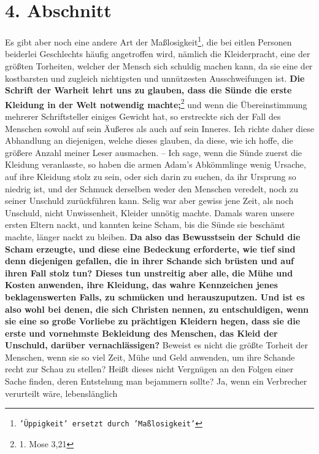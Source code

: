 \section{4. Abschnitt} \label{kap14_ab4}

Es gibt aber noch eine andere Art der Maßlosigkeit\footnote{\texttt{'Üppigkeit'
ersetzt
durch 'Maßlosigkeit'}}, die bei eitlen Personen beiderlei
Geschlechts häufig angetroffen wird, nämlich die Kleiderpracht,
eine der
größten Torheiten, welcher der Mensch sich schuldig machen kann, da sie eine
der kostbarsten und zugleich nichtigsten und unnützesten Ausschweifungen ist.
\textbf{Die
Schrift der Warheit lehrt uns zu glauben, dass die Sünde die erste Kleidung in
der
Welt notwendig machte;}\footnote{1. Mose 3,21}
und wenn die Übereinstimmung
mehrerer Schriftsteller einiges Gewicht hat, so erstreckte sich der Fall des
Menschen sowohl auf sein Äußeres als auch auf sein Inneres. Ich richte daher
diese
Abhandlung an diejenigen, welche dieses glauben, da diese, wie ich hoffe, die
größere Anzahl meiner Leser ausmachen. -- Ich sage, wenn die Sünde zuerst die
Kleidung veranlasste, so haben die armen Adam’s
Abkömmlinge wenig Ursache, auf
ihre Kleidung stolz zu sein, oder sich darin zu suchen, da ihr Ursprung so
niedrig ist, und der Schmuck derselben weder den Menschen veredelt, noch zu
seiner Unschuld zurückführen kann. Selig war aber gewiss jene Zeit, als noch
Unschuld, nicht Unwissenheit, Kleider unnötig machte. Damals waren unsere ersten
Eltern nackt, und kannten keine Scham, bis die Sünde sie beschämt
machte,
länger nackt zu bleiben. \label{ref:14_04_wahre_nachfolger_kleidung}
\textbf{Da also das Bewusstsein der Schuld die Scham erzeugte,
und diese eine Bedeckung erforderte, wie tief sind denn diejenigen gefallen, die
in ihrer Schande sich brüsten und auf ihren Fall stolz tun? Dieses tun
unstreitig aber alle, die Mühe und Kosten anwenden, ihre Kleidung, das wahre
Kennzeichen jenes beklagenswerten Falls, zu schmücken und herauszuputzen. Und
ist es also wohl bei denen, die sich Christen nennen, zu entschuldigen, wenn sie
eine so große Vorliebe zu prächtigen Kleidern hegen, dass sie die erste und
vornehmste Bekleidung des Menschen, das Kleid der Unschuld, darüber
vernachlässigen?} Beweist es nicht die größte Torheit der Menschen, wenn sie so
viel Zeit, Mühe und Geld anwenden, um ihre Schande recht zur Schau zu stellen?
Heißt dieses nicht Vergnügen an den Folgen einer Sache finden, deren Entstehung
man bejammern sollte? Ja, wenn ein Verbrecher verurteilt wäre, lebenslänglich
